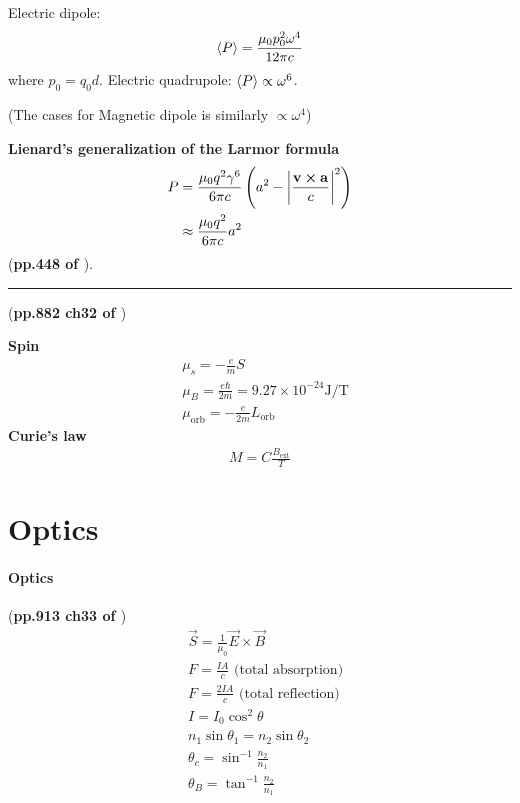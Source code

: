 \documentclass{article}
\numberwithin{equation}{subsection} %
\theoremstyle{definition}
\begin{document}
Electric dipole:
\begin{equation}
    \braket{P} = \frac{\mu_0 p_0^2 \omega^4}{12\pi c}
\end{equation}
where $p_0 = q_0 d$.
Electric quadrupole: $\braket{P} \propto \omega^6$.

(The cases for Magnetic dipole is similarly $\propto \omega^4$)

\textbf{Lienard's generalization of the Larmor formula}
\begin{align}
    P &= \frac{\mu_0 q^2 \gamma^6}{6\pi c}
    \left( a^2- \abs{\frac{\vb{v}\cross\vb{a}}{c}}^2\right) \\
    &\approx \frac{\mu_0q^2}{6\pi c} a^2
\end{align}
(\textbf{pp.448 of \cite{Griffiths_electrod}}).

\begin{center}\noindent\rule{8cm}{0.4pt}\end{center}

(\textbf{pp.882 ch32 of \cite{book}})

\textbf{Spin}
\begin{align}
    & \mu_s = -\frac{e}{m} S \\
    & \mu_B = \frac{e\hbar}{2m} = 9.27\times 10^{-24} \text{J/T} \\
    & \mu_\text{orb} = -\frac{e}{2m} L_\text{orb}
\end{align}
\textbf{Curie's law} 
\begin{align}
    M = C\frac{B_\text{ext}}{T}
\end{align}

\section{Optics}
\label{sec:Optics}

\paragraph{Optics} (\textbf{pp.913 ch33 of \cite{book}})
\begin{align}
    & \vec{S} = \frac{1}{\mu_0} \vec{E}\times\vec{B} \\
    & F = \frac{IA}{c} \text{ (total absorption)} \\
    & F = \frac{2IA}{c} \text{ (total reflection)} \\
    & I = I_0 \cos^2{\theta} \\
    & n_1 \sin{\theta_1} = n_2 \sin{\theta_2} \\
    & \theta_c = \sin^{-1}\frac{n_2}{n_1} \\
    & \theta_B = \tan^{-1}\frac{n_2}{n_1}
\end{align}
\end{document}
